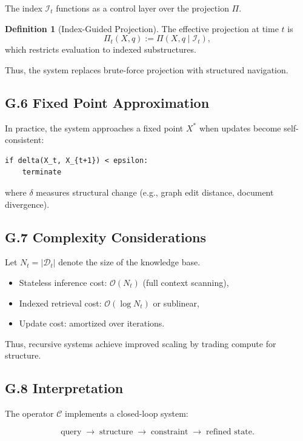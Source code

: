 \documentclass[12pt, oneside]{article}
\theoremstyle{plain}
\theoremstyle{definition}
\newtheorem{definition}[theorem]{Definition}
\theoremstyle{remark}
\begin{document}
The index $\mathcal{I}_t$ functions as a control layer over the projection $\Pi$.

\begin{definition}[Index-Guided Projection]
The effective projection at time $t$ is
\[
\Pi_t(X, q) := \Pi(X, q \mid \mathcal{I}_t),
\]
which restricts evaluation to indexed substructures.
\end{definition}

Thus, the system replaces brute-force projection with structured navigation.

\subsection{G.6 Fixed Point Approximation}

In practice, the system approaches a fixed point $X^*$ when updates become self-consistent:

\begin{verbatim}
if delta(X_t, X_{t+1}) < epsilon:
    terminate
\end{verbatim}

where $\delta$ measures structural change (e.g., graph edit distance, document divergence).

\subsection{G.7 Complexity Considerations}

Let $N_t = |\mathcal{D}_t|$ denote the size of the knowledge base.

\begin{itemize}
\item Stateless inference cost: $\mathcal{O}(N_t)$ (full context scanning),
\item Indexed retrieval cost: $\mathcal{O}(\log N_t)$ or sublinear,
\item Update cost: amortized over iterations.
\end{itemize}

Thus, recursive systems achieve improved scaling by trading compute for structure.

\subsection{G.8 Interpretation}

The operator $\mathcal{C}$ implements a closed-loop system:

\[
\text{query} \;\to\; \text{structure} \;\to\; \text{constraint} \;\to\; \text{refined state}.
\]
\end{document}
